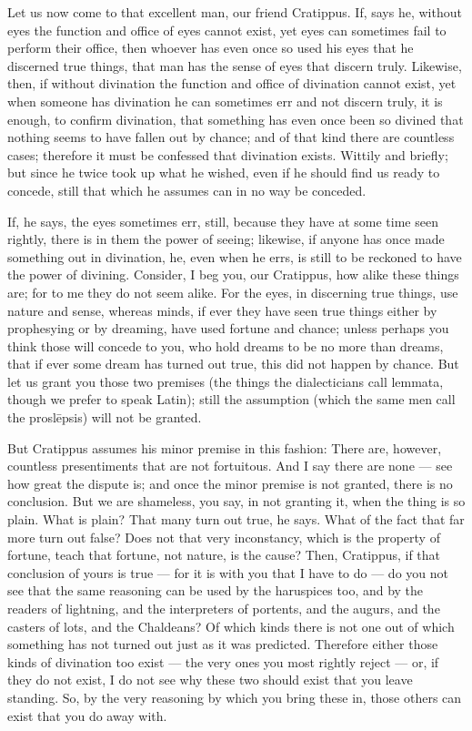  Let us now come to that excellent man, our friend Cratippus. If, says he, without eyes the function and office of eyes cannot exist, yet eyes can sometimes fail to perform their office, then whoever has even once so used his eyes that he discerned true things, that man has the sense of eyes that discern truly. Likewise, then, if without divination the function and office of divination cannot exist, yet when someone has divination he can sometimes err and not discern truly, it is enough, to confirm divination, that something has even once been so divined that nothing seems to have fallen out by chance; and of that kind there are countless cases; therefore it must be confessed that divination exists. Wittily and briefly; but since he twice took up what he wished, even if he should find us ready to concede, still that which he assumes can in no way be conceded.

 If, he says, the eyes sometimes err, still, because they have at some time seen rightly, there is in them the power of seeing; likewise, if anyone has once made something out in divination, he, even when he errs, is still to be reckoned to have the power of divining. Consider, I beg you, our Cratippus, how alike these things are; for to me they do not seem alike. For the eyes, in discerning true things, use nature and sense, whereas minds, if ever they have seen true things either by prophesying or by dreaming, have used fortune and chance; unless perhaps you think those will concede to you, who hold dreams to be no more than dreams, that if ever some dream has turned out true, this did not happen by chance. But let us grant you those two premises (the things the dialecticians call lemmata, though we prefer to speak Latin); still the assumption (which the same men call the prosl\=epsis) will not be granted.

 But Cratippus assumes his minor premise in this fashion: There are, however, countless presentiments that are not fortuitous. And I say there are none — see how great the dispute is; and once the minor premise is not granted, there is no conclusion. But we are shameless, you say, in not granting it, when the thing is so plain. What is plain? That many turn out true, he says. What of the fact that far more turn out false? Does not that very inconstancy, which is the property of fortune, teach that fortune, not nature, is the cause? Then, Cratippus, if that conclusion of yours is true — for it is with you that I have to do — do you not see that the same reasoning can be used by the haruspices too, and by the readers of lightning, and the interpreters of portents, and the augurs, and the casters of lots, and the Chaldeans? Of which kinds there is not one out of which something has not turned out just as it was predicted. Therefore either those kinds of divination too exist — the very ones you most rightly reject — or, if they do not exist, I do not see why these two should exist that you leave standing. So, by the very reasoning by which you bring these in, those others can exist that you do away with.

